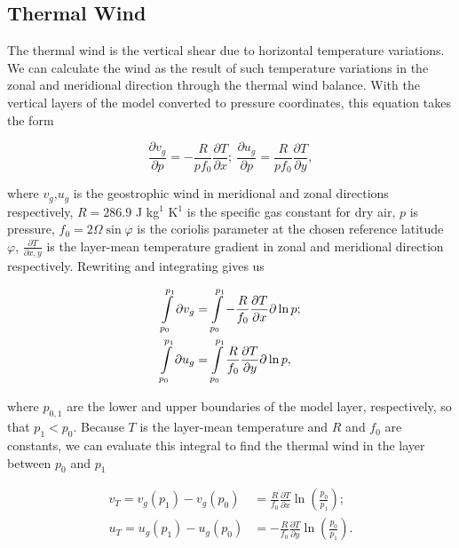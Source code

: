 \subsection{Thermal Wind}
The thermal wind is the vertical shear due to horizontal temperature variations. We can calculate the wind as the result of such temperature variations in the zonal and meridional direction through the thermal wind balance. With the vertical layers of the model converted to pressure coordinates, this equation takes the form 

\begin{equation}
    \frac{\partial v_g}{\partial p} = - \frac{R}{pf_0} \frac{\partial T}{\partial x};\ 
    \frac{\partial u_g}{\partial p} = \frac{R}{pf_0} \frac{\partial T}{\partial y},
\end{equation}

where $v_g$,$u_g$ is the geostrophic wind in meridional and zonal directions respectively, $R = 286.9$ J kg$^{1}$ K$^{1}$ is the specific gas constant for dry air, $p$ is pressure, $f_0 = 2\Omega \sin \varphi$ is the coriolis parameter at the chosen reference latitude $\varphi$, $\frac{\partial T}{\partial x,y}$ is the layer-mean temperature gradient in zonal and meridional direction respectively. Rewriting and integrating gives us

\begin{equation}
    \begin{split}
        \int\displaylimits_{p_0}^{p_1} \partial v_g &= \int\displaylimits_{p_0}^{p_1} - \frac{R}{f_0} \frac{\partial T}{\partial x} \partial \ln p; \\
        \int\displaylimits_{p_0}^{p_1} \partial u_g &= \int\displaylimits_{p_0}^{p_1} \frac{R}{f_0} \frac{\partial T}{\partial y} \partial \ln p,
    \end{split}
\end{equation}

where $p_{0,1}$ are the lower and upper boundaries of the model layer, respectively, so that $p_1 < p_0$. Because $T$ is the layer-mean temperature and $R$ and $f_0$ are constants, we can evaluate this integral to find the thermal wind in the layer between $p_0$ and $p_1$

\begin{equation}
    \begin{split}
        v_T = v_g(p_1) - v_g(p_0) &= \frac{R}{f_0} \frac{\partial T}{\partial x} \ln\left(\frac{p_0}{p_1}\right);\\
        u_T = u_g(p_1) - u_g(p_0) &= - \frac{R}{f_0} \frac{\partial T}{\partial y} \ln\left(\frac{p_0}{p_1}\right).
    \end{split}
\end{equation}

